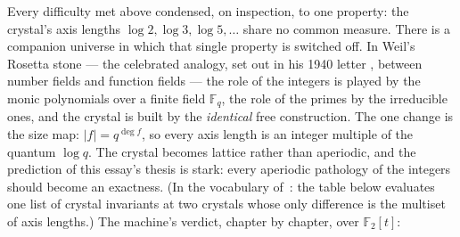 \documentclass[11pt]{article}
\theoremstyle{remark}
\begin{document}
Every difficulty met above condensed, on inspection, to one property: the crystal's axis lengths
$\log 2, \log 3, \log 5, \ldots$ share no common measure. There is a companion universe in which that
single property is switched off. In Weil's Rosetta stone --- the celebrated analogy, set out in his
1940 letter \cite{Krieger}, between number fields and function fields --- the role of the integers is
played by the monic polynomials over a finite field $\mathbb{F}_q$, the role of the primes by the
irreducible ones, and the crystal is built by the \emph{identical} free construction. The one change
is the size map: $|f| = q^{\deg f}$, so every axis length is an integer multiple of the quantum
$\log q$. The crystal becomes lattice rather than aperiodic, and the prediction of this essay's
thesis is stark: every aperiodic pathology of the integers should become an exactness. (In the
vocabulary of~\cite{Defs}: the table below evaluates one list of crystal invariants at two
crystals whose only difference is the multiset of axis lengths.) The machine's
verdict, chapter by chapter, over $\mathbb{F}_2[t]$:
\end{document}
